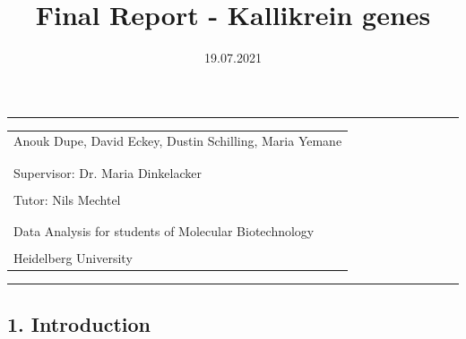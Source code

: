 \documentclass[
]{article}
\title{Final Report - Kallikrein genes}
\author{}
\date{\vspace{-2.5em}19.07.2021}
\begin{document}
\maketitle

\thispagestyle{empty}
\hrule
\vspace{0.3cm}
\begin{center}
    \vspace{1cm}
  \large
    \begin{tabular}[c]{l}
     \\

Anouk Dupe, David Eckey, Dustin Schilling, Maria Yemane \\
\\
     \\
    Supervisor:
    Dr. Maria Dinkelacker \\
     \\
    Tutor:
    Nils Mechtel \\
     \\
     \\
    Data Analysis for students of Molecular Biotechnology \\
    \\
    Heidelberg University 
    \vspace{0.3cm} \\
    \end{tabular}
    \end{center}

\begin{center}\rule{0.5\linewidth}{0.5pt}\end{center}

\pagebreak
\tableofcontents
\pagebreak
{}

\hypertarget{introduction}{%
\subsection{1. Introduction}\label{introduction}}
\end{document}
